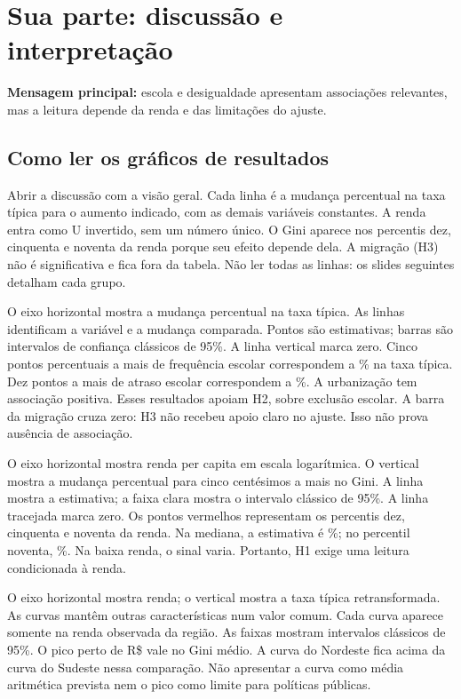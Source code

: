 \section{Sua parte: discussão e interpretação}
\textbf{Mensagem principal:} escola e desigualdade apresentam associações relevantes, mas a leitura depende da renda e das limitações do ajuste.
\subsection{Como ler os gráficos de resultados}
\begin{description}[leftmargin=0pt]
\item[Slide 10: tabela de estimativas, 60 segundos.] Abrir a discussão com a visão geral. Cada linha é a mudança percentual na taxa típica para o aumento indicado, com as demais variáveis constantes. A renda entra como U invertido, sem um número único. O Gini aparece nos percentis dez, cinquenta e noventa da renda porque seu efeito depende dela. A migração (H3) não é significativa e fica fora da tabela. Não ler todas as linhas: os slides seguintes detalham cada grupo.
\item[Slide 11: escola, urbanização e migração, 65 segundos.] O eixo horizontal mostra a mudança percentual na taxa típica. As linhas identificam a variável e a mudança comparada. Pontos são estimativas; barras são intervalos de confiança clássicos de 95\%. A linha vertical marca zero. Cinco pontos percentuais a mais de frequência escolar correspondem a \nEscolaEfeito\% na taxa típica. Dez pontos a mais de atraso escolar correspondem a \nDistorcaoEfeito\%. A urbanização tem associação positiva. Esses resultados apoiam H2, sobre exclusão escolar. A barra da migração cruza zero: H3 não recebeu apoio claro no ajuste. Isso não prova ausência de associação.
\item[Slide 12: Gini $\times$ renda, 70 segundos.] O eixo horizontal mostra renda per capita em escala logarítmica. O vertical mostra a mudança percentual para cinco centésimos a mais no Gini. A linha mostra a estimativa; a faixa clara mostra o intervalo clássico de 95\%. A linha tracejada marca zero. Os pontos vermelhos representam os percentis dez, cinquenta e noventa da renda. Na mediana, a estimativa é \nGiniEfMediana\%; no percentil noventa, \nGiniEfNoventa\%. Na baixa renda, o sinal varia. Portanto, H1 exige uma leitura condicionada à renda.
\item[Slide 13: renda e região, 55 segundos.] O eixo horizontal mostra renda; o vertical mostra a taxa típica retransformada. As curvas mantêm outras características num valor comum. Cada curva aparece somente na renda observada da região. As faixas mostram intervalos clássicos de 95\%. O pico perto de R\$ \nPico{} vale no Gini médio. A curva do Nordeste fica acima da curva do Sudeste nessa comparação. Não apresentar a curva como média aritmética prevista nem o pico como limite para políticas públicas.
\end{description}
